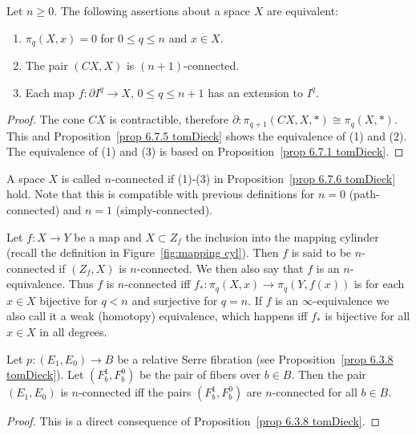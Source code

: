 \begin{prop}\label{prop 6.7.6 tomDieck}
    Let $n\geq 0$. The following assertions about a space $X$ are equivalent:
    \begin{enumerate}
        \item $\pi_q(X,x)=0$ for $0\leq q\leq n$ and $x\in X$.
        \item The pair $(CX,X)$ is $(n+1)$-connected.
        \item Each map $f:\partial I^q\to X$, $0\leq q\leq n+1$ has an extension to $I^q$.
    \end{enumerate}
\end{prop}
\begin{proof}
    The cone $CX$ is contractible, therefore $\partial:\pi_{q+1}(CX,X,*)\cong \pi_q(X,*)$. This and Proposition~\ref{prop 6.7.5 tomDieck} shows the equivalence of (1) and (2). The equivalence of (1) and (3) is based on Proposition~\ref{prop 6.7.1 tomDieck}.
\end{proof}

\begin{defn}
    A space $X$ is called $n$-connected if (1)-(3) in Proposition~\ref{prop 6.7.6 tomDieck} hold. Note that this is compatible with previous definitions for $n=0$ (path-connected) and $n=1$ (simply-connected).
\end{defn}

\begin{defn}[$n$-equivalence]
    Let $f:X\to Y$ be a map and $X\subset Z_f$ the inclusion into the mapping cylinder (recall the definition in Figure~\ref{fig:mapping cyl}). Then $f$ is said to be $n$-connected if $(Z_f,X)$ is $n$-connected. We then also say that $f$ is an $n$-equivalence. Thus $f$ is $n$-connected iff $f_\ast:\pi_q(X,x)\to \pi_q(Y,f(x))$ is for each $x\in X$ bijective for $q<n$ and surjective for $q=n$. If $f$ is an $\infty$-equivalence we also call it a weak (homotopy) equivalence, which happens iff $f_\ast$ is bijective for all $x\in X$ in all degrees.
\end{defn}

\begin{prop}\label{prop 6.7.7 tomDieck}
    Let $p:(E_1,E_0)\to B$ be a relative Serre fibration (see Proposition~\ref{prop 6.3.8 tomDieck}). Let $(F^1_b,F^0_b)$ be the pair of fibers over $b\in B$. Then the pair $(E_1,E_0)$ is $n$-connected iff the pairs $(F^1_b,F^0_b)$ are $n$-connected for all $b\in B$.
\end{prop}
\begin{proof}
    This is a direct consequence of Proposition~\ref{prop 6.3.8 tomDieck}.
\end{proof}

